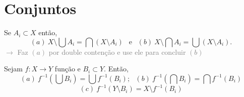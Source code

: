 \section{Conjuntos}

\begin{lemma}
    Se \(A_i \subset X\) então, 
    \[(a)\ X\setminus \bigcup A_i = \bigcap (X \setminus A_i) \ \ \text{ e } \ \ (b) \ X\setminus \bigcap A_i = \bigcup (X\setminus A_i). \]
    \textcolor{gray}{\(\rightarrow\) Faz \((a)\) por double contenção e use ele para concluir \((b)\)}
\end{lemma}

\begin{lemma}
    Sejam \(f:X\to Y\) função e \(B_i \subset Y\). Então,
    \[(a)\ f^{-1}\left(\bigcup B_i\right) = \bigcup f^{-1}(B_i); \ \ \ (b)\ f^{-1}\left(\bigcap B_i\right) = \bigcap f^{-1}(B_i)\]
    \[(c)\ f^{-1}\left(Y \setminus B_i\right) = X \setminus f^{-1}(B_i)\]
\end{lemma}


